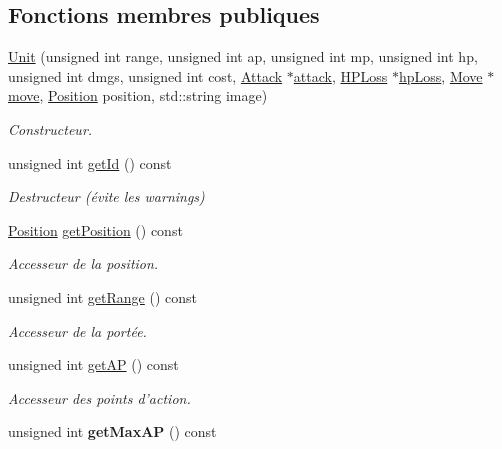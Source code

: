 \subsection*{Fonctions membres publiques}
\begin{DoxyCompactItemize}
\item 
\hypertarget{classUnit_aa921e68cbe458d7cf65c8ba4c23bc162}{\hyperlink{classUnit_aa921e68cbe458d7cf65c8ba4c23bc162}{Unit} (unsigned int range, unsigned int ap, unsigned int mp, unsigned int hp, unsigned int dmgs, unsigned int cost, \hyperlink{classAttack}{Attack} $\ast$\hyperlink{classUnit_ac06b8f6e30f851f15a42d8a1d951034a}{attack}, \hyperlink{classHPLoss}{H\+P\+Loss} $\ast$\hyperlink{classUnit_a3090f43e2ee6a08587a160afaa26e7cd}{hp\+Loss}, \hyperlink{classMove}{Move} $\ast$\hyperlink{classUnit_a8c6bfbaf9bf204baec6ba3c11468ec2f}{move}, \hyperlink{classPosition}{Position} position, std\+::string image)}\label{classUnit_aa921e68cbe458d7cf65c8ba4c23bc162}

\begin{DoxyCompactList}\small\item\em Constructeur. \end{DoxyCompactList}\item 
unsigned int \hyperlink{classUnit_a5178a7baf2fb908a6232c3117af4bebd}{get\+Id} () const 
\begin{DoxyCompactList}\small\item\em Destructeur (évite les warnings) \end{DoxyCompactList}\item 
\hyperlink{classPosition}{Position} \hyperlink{classUnit_acf607fa2a07b1c50829c151a865ff4e6}{get\+Position} () const 
\begin{DoxyCompactList}\small\item\em Accesseur de la position. \end{DoxyCompactList}\item 
unsigned int \hyperlink{classUnit_a583b24bee2b519bb4b6feb94502c2645}{get\+Range} () const 
\begin{DoxyCompactList}\small\item\em Accesseur de la portée. \end{DoxyCompactList}\item 
unsigned int \hyperlink{classUnit_ac44844d1a66456789d803e157baf500d}{get\+A\+P} () const 
\begin{DoxyCompactList}\small\item\em Accesseur des points d'action. \end{DoxyCompactList}\item 
\hypertarget{classUnit_ac869149c544c48d375318e4d0f2f118f}{unsigned int {\bfseries get\+Max\+A\+P} () const }\label{classUnit_ac869149c544c48d375318e4d0f2f118f}


\end{DoxyCompactItemize}
